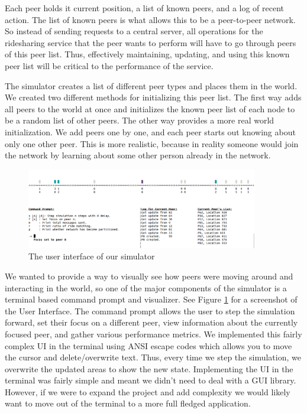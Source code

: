 \documentclass[letterpaper,11pt,twocolumn]{article}
\begin{document}
Each peer holds it current position, a list of known peers, and a log of recent action. The list of known peers is what allows this to be a peer-to-peer network. So instead of sending requests to a central server, all operations for the ridesharing service that the peer wants to perform will have to go through peers of this peer list. Thus, effectively maintaining, updating, and using this known peer list will be critical to the performance of the service. 

The simulator creates a list of different peer types and places them in the world. We created two different methods for initializing this peer list. The first way adds all peers to the world at once and initializes the known peer list of each node to be a random list of other peers. The other way provides a more real world initialization. We add peers one by one, and each peer starts out knowing about only one other peer. This is more realistic, because in reality someone would join the network by learning about some other person already in the network.

\begin{figure}[ht]
  \centering
   \includegraphics[width=0.9\textwidth]{images/ui.png}     
  \caption{The user interface of our simulator
           \label{ui}}
\end{figure} 


We wanted to provide a way to visually see how peers were moving around and interacting in the world, so one of the major components of the simulator is a terminal based command prompt and visualizer. See Figure \ref{ui} for a screenshot of the User Interface. The command prompt allows the user to step the simulation forward, set their focus on a different peer, view information about the currently focused peer, and gather various performance metrics. We implemented this fairly complex UI in the terminal using ANSI escape codes which allows you to move the cursor and delete/overwrite text. Thus, every time we step the simulation, we overwrite the updated areas to show the new state. Implementing the UI in the terminal was fairly simple and meant we didn’t need to deal with a GUI library. However, if we were to expand the project and add complexity we would likely want to move out of the terminal to a more full fledged application.
\end{document}
